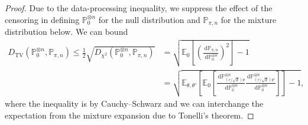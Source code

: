 \documentclass[11pt]{article}
\newcommand{\dint}{\,\mathrm{d}}
\begin{document}
\begin{proof}
 Due to the data-processing inequality, we suppress the effect of the censoring in defining $\mathbb{P}_0^{\otimes n}$ for the null distribution and $\mathbb{P}_{\pi, n}$ for the mixture distribution below. We can bound 
\begin{align*}
    D_{\mathrm{TV}}(\mathbb{P}_0^{\otimes n}, \mathbb{P}_{\pi, n}) \leq \frac{1}{2} \sqrt{D_{\chi^2}(\mathbb{P}_0^{\otimes n},\mathbb{P}_{\pi, n})} &= \sqrt{\mathbb{E}_0\left[\left(\frac{\dint \mathbb{P}_{\pi, n}}{\dint \mathbb{P}_0^{\otimes n}}\right)^2\right] - 1}\\
    &=  \sqrt{\mathbb{E}_{\theta, \theta'}\left[\mathbb{E}_0 \left[ \frac{\dint\mathbb{P}_{(r/\sqrt{d})\theta}^{\otimes n}}{\dint\mathbb{P}_0^{\otimes n}}\frac{\dint\mathbb{P}_{(r/\sqrt{d})\theta'}^{\otimes n}}{\dint\mathbb{P}_0^{\otimes n}} \right] \right] - 1},
\end{align*}
where the inequality is by Cauchy--Schwarz and we can interchange the expectation from the mixture expansion due to Tonelli's theorem. 


\end{proof}
\end{document}
